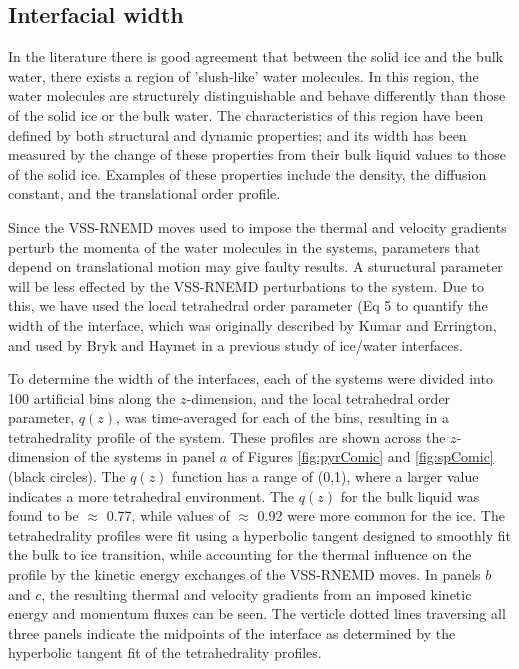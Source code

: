 \documentclass{pnastwo}
\begin{document}
\begin{article}
\subsection{Interfacial width}
In the literature there is good agreement that between the solid ice and 
the bulk water, there exists a region of 'slush-like' water molecules. 
In this region, the water molecules are structurely distinguishable and 
behave differently than those of the solid ice or the bulk water.
The characteristics of this region have been defined by both structural
and dynamic properties; and its width has been measured by the change of these 
properties from their bulk liquid values to those of the solid ice. 
Examples of these properties include the density, the diffusion constant, and 
the translational order profile. \cite{Bryk02,Karim90,Gay02,Hayward01,Hayward02,Karim88}  

Since the VSS-RNEMD moves used to impose the thermal and velocity gradients
 perturb the momenta of the water molecules in 
the systems, parameters that depend on translational motion may give
faulty results. A stuructural parameter will be less effected by the 
VSS-RNEMD perturbations to the system. Due to this, we have used the 
local tetrahedral order parameter (Eq 5\cite{Louden13} to quantify the width of the interface,
 which was originally described by Kumar\cite{Kumar09} and 
Errington\cite{Errington01}, and used by Bryk and Haymet in a previous study
of ice/water interfaces.\cite{Bryk04b} 

To determine the width of the interfaces, each of the systems were 
divided into 100 artificial bins along the 
$z$-dimension, and the local tetrahedral order parameter, $q(z)$, was 
time-averaged for each of the bins, resulting in a tetrahedrality profile of 
the system. These profiles are shown across the $z$-dimension of the systems
in panel $a$ of Figures \ref{fig:pyrComic}
and \ref{fig:spComic} (black circles). The $q(z)$ function has a range of 
(0,1), where a larger value indicates a more tetrahedral environment.
The $q(z)$ for the bulk liquid was found to be $\approx $ 0.77, while values of
$\approx $ 0.92 were more common for the ice. The tetrahedrality profiles were
fit using a hyperbolic tangent\cite{Louden13} designed to smoothly fit the 
bulk to ice 
transition, while accounting for the thermal influence on the profile by the
kinetic energy exchanges of the VSS-RNEMD moves. In panels $b$ and $c$, the
resulting thermal and velocity gradients from an imposed kinetic energy and
momentum fluxes can be seen. The verticle dotted
lines traversing all three panels indicate the midpoints of the interface
as determined by the hyperbolic tangent fit of the tetrahedrality profiles.
 

\end{article}
\end{document}
